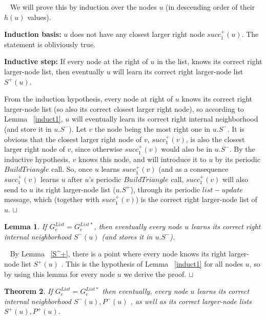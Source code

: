 \documentclass[11pt]{article}
\newtheorem{theorem}{Theorem}[section]
\newtheorem{lemma}[theorem]{Lemma}
\newcommand{\sq}{\hbox{\rlap{$\sqcap$}$\sqcup$}}
\newcommand{\qed}{\hspace*{\fill}\sq}
\newenvironment{proof}{\noindent {\bf Proof.}\ }{\qed\par\vskip 4mm\par}
\begin{document}
\begin{proof}
We will prove this by induction over the nodes $u$ (in descending order of their $h(u)$ values).


\textbf{Induction basis:} $u$ does not have any closest larger right node $succ^+_1(u)$. The statement is obliviously true.


\textbf{Inductive step:} If every node at the right of $u$ in the list, knows its correct right larger-node list, then eventually $u$ will learn its correct right larger-node list $S^+(u)$.

From the induction hypothesis, every node at right of $u$ knows its correct right larger-node list (so also its correct closest larger right node), so according to Lemma ~\ref{induct1}, $u$ will eventually learn its correct right internal neighborhood (and store it in $u.S^-$). Let $v$ the node being the most right one in $u.S^-$. It is obvious that the  closest larger right node of $v$, $succ^+_1(v)$, is also the closest larger right node of $v$, since otherwise $succ^+_1(v)$ would also be in $u.S^-$. By the inductive hypothesis, $v$ knows this node, and will introduce it to $u$ by its periodic $BuildTriangle$ call. So, once $u$ learns $succ^+_1(v)$ (and as a consequence $succ^+_1(v)$ learns $u$ after $u$'s periodic $BuildTriangle$ call, $succ^+_1(v)$ will also send to $u$ its right larger-node list ($u.S^+$), through its periodic $list-update$ message, which (together with $succ^+_1(v)$) is the correct right larger-node list of $u$.
\end{proof}


\begin{lemma}\label{S^-}
If $G^{List}_e=G^{List*}_e$, then eventually every node $u$ learns its correct right internal neighborhood $S^-(u)$ (and stores it in $u.S^-$).
\end{lemma}

\begin{proof}
By Lemma ~\ref{S^+}, there is a point where every node knows its right larger-node list $S^+(u)$ .
This is the hypothesis of Lemma ~\ref{induct1} for all nodes $u$, so by using this lemma for every node $u$ we derive the proof.
\end{proof}

\begin{theorem}\label{theo:phase3}
If $G^{List}_e=G^{List*}_e$ then eventually, every node $u$ learns its correct internal neighborhood $S^-(u), P^-(u)$ , as well as its correct larger-node lists $S^+(u),P^+(u)$.
\end{theorem}
\end{document}
